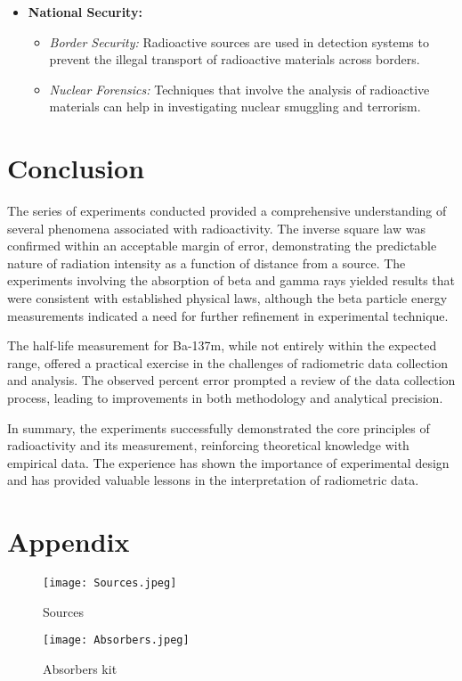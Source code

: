 \documentclass[11pt]{article}
\begin{document}
\begin{itemize}
		\item \textbf{National Security:}
		\begin{itemize}
			\item \textit{Border Security:} Radioactive sources are used in detection systems to prevent the illegal transport of radioactive materials across borders.
			\item \textit{Nuclear Forensics:} Techniques that involve the analysis of radioactive materials can help in investigating nuclear smuggling and terrorism.
		\end{itemize}
	\end{itemize}
	
	
\clearpage

	\section{Conclusion}

	The series of experiments conducted provided a comprehensive understanding of several phenomena associated with radioactivity. The inverse square law was confirmed within an acceptable margin of error, demonstrating the predictable nature of radiation intensity as a function of distance from a source. The experiments involving the absorption of beta and gamma rays yielded results that were consistent with established physical laws, although the beta particle energy measurements indicated a need for further refinement in experimental technique.
	
	The half-life measurement for Ba-137m, while not entirely within the expected range, offered a practical exercise in the challenges of radiometric data collection and analysis. The observed percent error prompted a review of the data collection process, leading to improvements in both methodology and analytical precision.
	
	In summary, the experiments successfully demonstrated the core principles of radioactivity and its measurement, reinforcing theoretical knowledge with empirical data. The experience has shown the importance of experimental design and has provided valuable lessons in the interpretation of radiometric data. 

\clearpage

	\printbibliography

\clearpage

	\section{Appendix}
	
	\begin{figure}[htbp]
		\centering
		\texttt{[image: Sources.jpeg]}
		\caption{Sources}
		\label{fig:Sources}
	\end{figure}
	
	\begin{figure}[htbp]
		\centering
		\texttt{[image: Absorbers.jpeg]}
		\caption{Absorbers kit}
		\label{fig:Absorbers}
	\end{figure}
	
\end{document}
